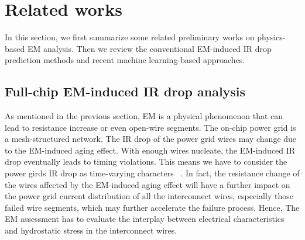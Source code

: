 \section{Related works}
\label{sec:related}

In this section, we first summarize some related preliminary works on physics-based EM analysis. Then we review the conventional EM-induced IR drop prediction methods and recent machine learning-based approaches.




\subsection{Full-chip EM-induced IR drop analysis}
\label{subsec:emspice}
As mentioned in the previous section, EM is a physical phenomenon that can lead to resistance increase or even open-wire segments.  The on-chip power grid is a mesh-structured network. The IR drop of the power grid wires may change due to the EM-induced aging effect. With enough wires nucleate, the EM-induced IR drop eventually leads to timing violations. This means we have to consider the power girds IR drop as time-varying characters ~\cite{SunYu:TDMR'20, Huang:TCAD'15, Chatterjee:2018TCAD,SukharevNajm:2018TDMR}. In fact, the resistance change of the wires affected by the EM-induced aging effect will have a further impact on the power grid current distribution of all the interconnect wires, especially those failed wire segments, which may further accelerate the failure process. Hence,  The EM assessment has to evaluate the interplay between electrical characteristics and hydrostatic stress in the interconnect wires. 

